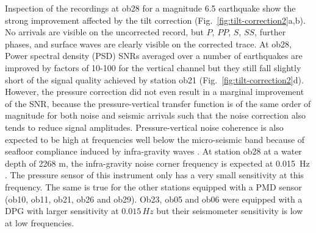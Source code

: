 \documentclass{article}
\providecommand{\remark}[1]{{[\bf #1]}}
\begin{document}
{Inspection of the recordings 
at ob28 for a magnitude 6.5 earthquake show the
strong improvement affected by the tilt correction
(Fig.~\ref{fig:tilt-correction2}a,b).  No arrivals are visible on the
uncorrected record, but $P$, $PP$, $S$, $SS$, further phases, and
surface waves are clearly visible on the corrected trace.
At ob28, 
Power spectral density (PSD) SNRs 
averaged over a number of earthquakes are improved by factors of
10-100 for the vertical channel but they still fall slightly short of
the signal quality achieved by station ob21  
(Fig.~\ref{fig:tilt-correction2}d).  
However, the pressure
correction did not even result in a marginal improvement of the SNR,
because the pressure-vertical transfer function is of the same order
of magnitude for both noise and seismic arrivals such
that the noise correction also tends to reduce signal amplitudes.
Pressure-vertical noise coherence is also expected to be high at
frequencies well below the micro-seismic band because of seafloor 
compliance induced by infra-gravity
waves \citep{webb:99}. 
At station ob28 at a water depth of 2268 m, the
infra-gravity noise corner frequency
is expected at 0.015~Hz . 
The pressure sensor of this instrument
only has a very small sensitivity at this frequency.  The same is true
for 
the other stations equipped with a PMD sensor 
(ob10, ob11, ob21, ob26 and ob29).  
Ob23, ob05 and ob06 were equipped with a DPG 
with larger sensitivity at $0.015\, Hz$ but their
seismometer sensitivity is low at low frequencies.  



}
\end{document}
